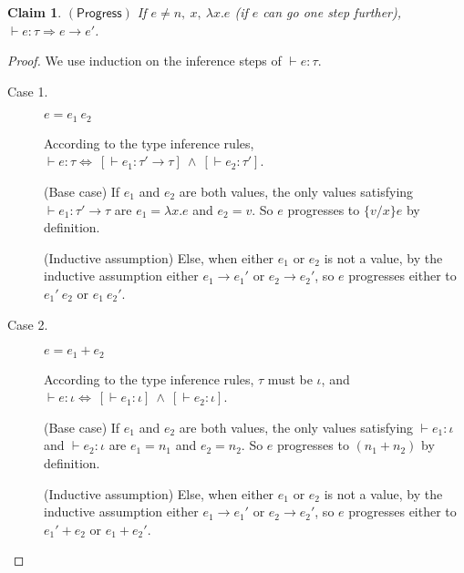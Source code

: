 \documentclass{article}
\newtheorem{clm}{Claim}[section]
\begin{document}
\begin{clm}$\mathsf{(Progress)}$
If $e \neq n,\:x,\:\lambda x.e$ (if $e$ can go one step further), $\vdash e : \tau \Rightarrow e \rightarrow e'$.
\end{clm}
\begin{proof}
We use induction on the inference steps of $\vdash e: \tau$.
\begin{description}
\item[Case 1.] $e = e_1 \: e_2$

According to the type inference rules, $\vdash e : \tau \Leftrightarrow \: [\vdash e_1 : \tau' \rightarrow \tau] \:\wedge\: [\vdash e_2 : \tau']$.

(Base case) If $e_1$ and $e_2$ are both values, the only values satisfying $\vdash e_1 : \tau' \rightarrow \tau$ are $e_1 = \lambda x.e$ and $e_2 = v$. So $e$ progresses to $\{v/x\}e$ by definition.
    
(Inductive assumption) Else, when either $e_1$ or $e_2$ is not a value, by the inductive assumption either $e_1 \rightarrow e_1'$ or $e_2 \rightarrow e_2'$, so $e$ progresses either to $e_1' \: e_2$ or $e_1 \: e_2'$.

\item[Case 2.] $e = e_1 + e_2$

According to the type inference rules, $\tau$ must be $\iota$, and $\vdash e : \iota \Leftrightarrow \: [\vdash e_1 : \iota] \:\wedge\: [\vdash e_2 : \iota]$.

(Base case) If $e_1$ and $e_2$ are both values, the only values satisfying $\vdash e_1 : \iota$ and $\vdash e_2 : \iota$ are $e_1 = n_1$ and $e_2 = n_2$. So $e$ progresses to $(n_1 + n_2)$ by definition.

(Inductive assumption) Else, when either $e_1$ or $e_2$ is not a value, by the inductive assumption either $e_1 \rightarrow e_1'$ or $e_2 \rightarrow e_2'$, so $e$ progresses either to $e_1' + e_2$ or $e_1 + e_2'$.
\end{description}
\end{proof}
\end{document}
